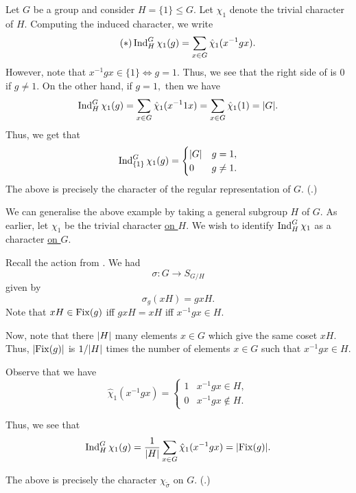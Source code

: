 \begin{ex}\label{ex:regrepinduct}
	Let $G$ be a group and consider $H = \{1\} \le G.$ Let $\chi_1$ denote the trivial character of $H.$ Computing the induced character, we write
	\begin{equation} \tag{$*$} \label{eq:006}
		\operatorname{Ind}^{G}_{H}\chi_1(g) = \sum_{x \in G} \hat{\chi}_1(x^{-1}gx).
	\end{equation}
	However, note that $x^{-1}gx \in \{1\} \iff g = 1.$ Thus, we see that the right side of  is $0$ if $g \neq 1.$ On the other hand, if $g = 1,$ then we have
	\begin{equation*} 
		\operatorname{Ind}^{G}_{H}\chi_1(g) = \sum_{x \in G} \hat{\chi}_1(x^{-1}1x) = \sum_{x \in G} \hat{\chi}_1(1) = {\left\lvert G \right\lvert}.
	\end{equation*}
	Thus, we get that 
	\begin{equation*} 
		\operatorname{Ind}^{G}_{\{1\}}\chi_1(g) = \begin{cases}
			{\left\lvert G \right\lvert} & g = 1,\\
			0 & g \neq 1.
		\end{cases}
	\end{equation*}
	The above is precisely the character of the regular representation of $G.$ (.)
\end{ex}

\begin{ex}\label{ex:permrepinduct}
	We can generalise the above example by taking a general subgroup $H$ of $G.$ As earlier, let $\chi_1$ be the trivial character \underline{on $H$}. We wish to identify $\operatorname{Ind}^{G}_{H}\chi_1$ as a character \underline{on $G$}.

	Recall the action from . We had
	\begin{equation*} 
		\sigma : G \to S_{G/H}
	\end{equation*}
	given by 
	\begin{equation*} 
		\sigma_g(xH) = gxH.
	\end{equation*}
	Note that $xH \in \operatorname{Fix}(g)$ iff $gxH = xH$ iff $x^{-1}gx \in H.$

	Now, note that there ${\left\lvert H \right\lvert}$ many elements $x \in G$ which give the same coset $xH.$ Thus, ${\left\lvert \operatorname{Fix}(g) \right\lvert}$ is $1/{\left\lvert H \right\lvert}$ times the number of elements $x \in G$ such that $x^{-1}gx \in H.$

	Observe that we have
	\begin{equation*} 
		\hat{\chi}_1(x^{-1}gx) = \begin{cases}
			1 & x^{-1}gx \in H,\\
			0 & x^{-1}gx \notin H.
		\end{cases}
	\end{equation*}

	Thus, we see that
	\begin{equation*} 
		\operatorname{Ind}^{G}_{H}\chi_1(g) = \frac{1}{{\left\lvert H \right\lvert}}\sum_{x \in G} \hat{\chi}_1(x^{-1}gx) = {\left\lvert \operatorname{Fix}(g) \right\lvert}.
	\end{equation*}

	The above is precisely the character $\chi_{\widetilde{\sigma}}$ on $G.$ (.)
\end{ex}

